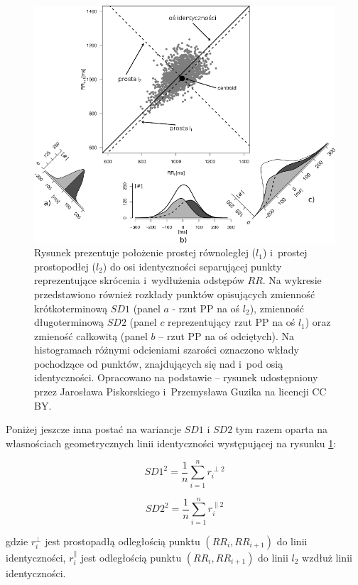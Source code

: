 \begin{figure}
\centering
\includegraphics[width=\textwidth]{graph/pp_distrib.jpg}
\caption{Rysunek prezentuje położenie prostej równoległej ($l_1$) i~prostej prostopodłej ($l_2$) do osi identyczności separującej punkty reprezentujące skrócenia i~wydłużenia odstępów $RR$. Na wykresie przedstawiono również rozkłady punktów opisujących zmienność krótkoterminową $SD1$ (panel $a$ - rzut PP na oś $l_2$), zmienność długoterminową $SD2$ (panel $c$ reprezentujący rzut PP na oś $l_1$) oraz zmieność całkowitą (panel $b$ -- rzut PP na oś odciętych). Na histogramach różnymi odcieniami szarości oznaczono wkłady pochodzące od punktów, znajdujących się nad i~pod osią identyczności. Opracowano na podstawie \cite{hrstruct} -- rysunek udostępniony przez Jarosława Piskorskiego i~Przemysława Guzika na licencji CC BY.}
\label{fig:pp_distrib}
\end{figure}

Poniżej jeszcze inna postać na wariancje $SD1$ i $SD2$ tym razem oparta na własnościach geometrycznych linii identyczności występującej na rysunku \ref{fig:pp_distrib}: 

\begin{equation}
SD1^2 = \frac{1}{n}\sum_{i=1}^{n}r_{i}^{\perp 2}
\end{equation}

\begin{equation}
SD2^2 = \frac{1}{n}\sum_{i=1}^{n}r_{i}^{\parallel 2}
\end{equation}

gdzie $r_{i}^{\perp}$ jest prostopadłą odległością punktu $(RR_{i}, RR_{i+1})$ do linii
identyczności, $r_{i}^{\parallel}$ jest odległością punktu $(RR_{i}, RR_{i+1})$ do linii
$l_2$ wzdłuż linii identyczności.

